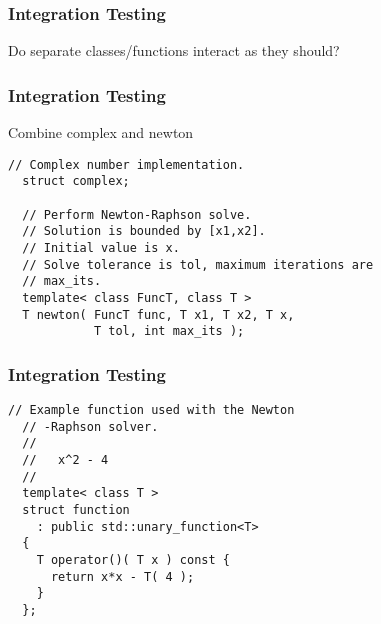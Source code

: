 \begin{frame}
  \frametitle{Integration Testing}
  \vspace{4cm}
  {\Large\color{Base09}Do separate classes/functions interact as they should?}
\end{frame}

\begin{frame}[fragile]
  \frametitle{Integration Testing}
  \begin{block}{Combine complex and newton}
    \begin{lstlisting}[style=C]
  // Complex number implementation.
  struct complex;

  // Perform Newton-Raphson solve.
  // Solution is bounded by [x1,x2].
  // Initial value is x.
  // Solve tolerance is tol, maximum iterations are
  // max_its.
  template< class FuncT, class T >
  T newton( FuncT func, T x1, T x2, T x,
            T tol, int max_its );
    \end{lstlisting}
  \end{block}
\end{frame}

\begin{frame}[fragile]
  \frametitle{Integration Testing}
  \begin{example}
    \begin{lstlisting}[style=C]
  // Example function used with the Newton
  // -Raphson solver.
  //
  //   x^2 - 4
  //
  template< class T >
  struct function
    : public std::unary_function<T>
  {
    T operator()( T x ) const {
      return x*x - T( 4 );
    }
  };
    \end{lstlisting}
  \end{example}
\end{frame}

